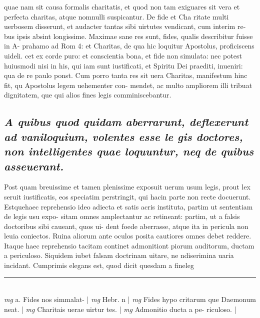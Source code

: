 \documentclass{article}
\begin{document}
\begin{pages}
quae nam sit causa formalis charitatis, et quod non tam exiguares sit vera et perfecta charitas, atque  nomnulli suspicantur. De fide et Cha ritate multi uerbosem disserunt, et audacter tantas sibi uirtutes vendicant, cum interim re- bus ipsis absint longissime. Maximae sane res sunt, fides, qualis describitur fuisse in A- prahamo ad Rom 4: et Charitas, de qua hic loquitur Apostolus, proficiscens uideli. cet ex corde puro: et conscientia bona, et fide non simulata: nec potest huiusmodi nisi in his, qui iam sunt iustificati, et Spiritu Dei praediti, inueniri: qua de re paulo ponst. Cum porro tanta res sit uera Charitas, manifestum hinc fit, qu Apostolus legem uehementer con- mendet, ac multo ampliorem illi tribuat dignitatem, que  qui alios fines legis comminiscebantur.  \pend
{}
{}
\subsection*{\textit{A quibus quod quidam aberrarunt, deflexerunt ad vaniloquium, volentes esse le gis doctores, non intelligentes quae loquuntur, neq de quibus asseuerant. }}\pstart Post quam breuissime et tamen plenissime exposuit uerum usum legis, prout lex seruit iustificatis, eos speciatim perstringit, qui hacin parte non recte docuerunt. Estquehaec reprehensio ideo adiecta et satis acris instituta, partim ut sententiam de legis usu expo- sitam omnes amplectantur ac retineant: partim, ut a falsis doctoribus sibi caueant, quos ui- dent foede aberrasse, atque  ita in pericula non leuia coniectos. Ruina aliorum ante oculos posita cautiores omnes debet reddere. Itaque  haec reprehensio tacitam continet admonitiont piorum auditorum, ductam a periculoso. Siquidem iubet falsam doctrinam uitare, ne ndiserimina uaria incidant. Cumprimis elegans est, quod dicit quesdam a fineleg  \pend
\vspace{0.5cm}\noindent
\vspace{0.2cm}\rule{1cm}{0.2pt}\\ 
\hspace{0.2cm}\textit{mg}
\footnotesize a. Fides nos simmalat- 
\normalsize| 
\hspace{0.2cm}\textit{mg}
\footnotesize Hebr. n 
\normalsize| 
\hspace{0.2cm}\textit{mg}
\footnotesize Fides hypo critarum que  Daemonum neat. 
\normalsize| 
\hspace{0.2cm}\textit{mg}
\footnotesize Charitais uerae uirtur tes. 
\normalsize| 
\hspace{0.2cm}\textit{mg}
\footnotesize Admonitio ducta a pe- riculoso. 
\normalsize| 

\end{pages}
\end{document}
